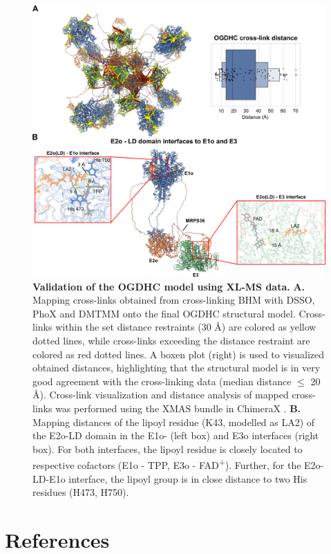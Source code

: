 \begin{subappendices}
\begin{figure}[hbt]
        \includegraphics[]{Chapter.5/Figures/SI_Figure4.png}
        \caption{\textbf{Validation of the OGDHC model using XL-MS data.} \textbf{A.} Mapping cross-links obtained from cross-linking BHM with DSSO, PhoX and DMTMM onto the final OGDHC structural model. Cross-links within the set distance restraints (30 Å) are colored as yellow dotted lines, while cross-links exceeding the distance restraint are colored as red dotted lines. A boxen plot (right) is used to visualized obtained distances, highlighting that the structural model is in very good agreement with the cross-linking data (median distance $\leq$ 20 Å). Cross-link visualization and distance analysis of mapped cross-links was performed using the XMAS bundle in ChimeraX \cite{Lagerwaard_2022}. \textbf{B.} Mapping distances of the lipoyl residue (K43, modelled as LA2) of the E2o-LD domain in the E1o- (left box) and E3o interfaces (right box). For both interfaces, the lipoyl residue is closely located to respective cofactors (E1o - TPP, E3o - FAD\textsuperscript{+}). Further, for the E2o-LD-E1o interface, the lipoyl group is in close distance to two His residues (H473, H750).}
        \label{fig:ch5_app_fig4}
    \end{figure}
\end{subappendices}
%
\clearpage
\section*{References}


\stopthumb
